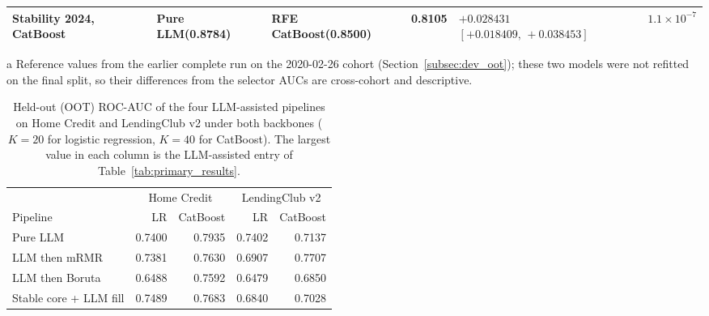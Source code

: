 \documentclass[final,5p,twocolumn]{elsarticle}
\newcommand{\Kfeat}{K}
\begin{document}
\begin{table}[htbp]
\begin{threeparttable}
\begin{tabular}{@{}L{21mm}L{25mm}L{22mm}rL{36mm}r@{}}
\addlinespace
Stability 2024, CatBoost & Pure LLM\newline (0.8784) & RFE CatBoost\newline (0.8500) & 0.8105 & $+0.028431$\newline $[+0.018409,\,+0.038453]$ & $1.1\times10^{-7}$ \\
\bottomrule
\end{tabular}
\begin{tablenotes}\scriptsize
\item[a] Reference values from the earlier complete run on the 2020-02-26 cohort (Section~\ref{subsec:dev_oot}); these two models were not refitted on the final split, so their differences from the selector AUCs are cross-cohort and descriptive.
\end{tablenotes}
\end{threeparttable}
\end{table}

\begin{table}[htbp]
\centering
\footnotesize
\caption{Held-out (OOT) ROC-AUC of the four LLM-assisted pipelines on Home Credit and LendingClub v2 under both backbones ($\Kfeat=20$ for logistic regression, $\Kfeat=40$ for CatBoost). The largest value in each column is the LLM-assisted entry of Table~\ref{tab:primary_results}.}
\label{tab:llm_pipelines}
\setlength{\tabcolsep}{4pt}
\begin{tabular}{@{}lrrrr@{}}
\toprule
 & \multicolumn{2}{c}{Home Credit} & \multicolumn{2}{c}{LendingClub v2} \\
\cmidrule(lr){2-3}\cmidrule(l){4-5}
Pipeline & LR & CatBoost & LR & CatBoost \\
\midrule
Pure LLM & 0.7400 & 0.7935 & 0.7402 & 0.7137 \\
LLM then mRMR & 0.7381 & 0.7630 & 0.6907 & 0.7707 \\
LLM then Boruta & 0.6488 & 0.7592 & 0.6479 & 0.6850 \\
Stable core + LLM fill & 0.7489 & 0.7683 & 0.6840 & 0.7028 \\
\bottomrule
\end{tabular}
\end{table}
\end{document}
